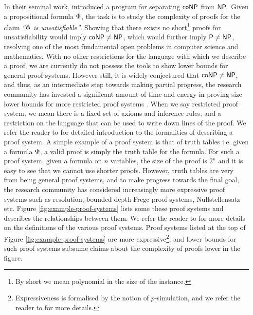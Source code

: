 \documentclass[11pt]{article}
\begin{document}
In their seminal work, \citet{cook1979relative} introduced a program for separating $\mathsf{coNP}$ from $\mathsf{NP}$.
Given a propositional formula $\Phi$, the task is to study the complexity of proofs for the claim \textit{``$\Phi$ is unsatisfiable''}.
Showing that there exists no short\footnote{By short we mean polynomial in the size of the instance.} proofs for unsatisfiability would imply $\mathsf{coNP} \neq \mathsf{NP}$, which would further imply $\mathsf{P} \neq \mathsf{NP}$, resolving one of the most fundamental open problems in computer science and mathematics.
With no other restrictions for the language with which we describe a proof, we are currently do not possess the tools to show lower bounds for general proof systems. 
However still, it is widely conjectured that $\mathsf{coNP} \neq \mathsf{NP}$, and thus, as an intermediate step towards making partial progress, the research community has invested a significant amount of time and energy in proving size lower bounds for more restricted proof systems \citep{blake1937canonical,razborov1998lower, impagliazzo1999lower, alekhnovich2001lower, buss1999linear}.
When we say restricted proof system, we mean there is a fixed set of axioms and inference rules, and a restriction on the language that can be used to write down lines of the proof. We refer the reader to \citep{krajicek2019proof} for detailed introduction to the formalities of describing a proof system.
A simple example of a proof system is that of truth tables i.e. given a formula $\Phi$, a valid proof is simply the truth table for the formula.
For such a proof system, given a formula on $n$ variables, the size of the proof is $2^n$ and it is easy to see that we cannot use shorter proofs.
However, truth tables are very from being general proof systems, and to make progress towards the final goal, the research community has considered increasingly more expressive proof systems such as resolution, bounded depth Frege proof systems, Nullstellensatz etc.
Figure \ref{fig:example-proof-systems} lists some these proof systems and describes the relationships between them.
We refer the reader to \citep{krajicek2019proof, ProofComplexityLecNotesPaul} for more details on the definitions of the various proof systems.
Proof systems listed at the top of Figure \ref{fig:example-proof-systems} are more expressive\footnote{Expressiveness is formalised by the notion of $p$-simulation, and we refer the reader to \citep[Definition 1.6]{ProofComplexityLecNotes} for more details.}, and lower bounds for such proof systems subsume claims about the complexity of proofs lower in the figure.\par
\end{document}
